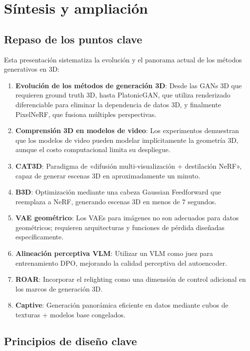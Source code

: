 \section{Síntesis y ampliación}

\subsection{Repaso de los puntos clave}

Esta presentación sistematiza la evolución y el panorama actual de los métodos generativos en 3D:

\begin{enumerate}
    \item \textbf{Evolución de los métodos de generación 3D}: Desde las GANs 3D que requieren ground truth 3D, hasta PlatonicGAN, que utiliza renderizado diferenciable para eliminar la dependencia de datos 3D, y finalmente PixelNeRF, que fusiona múltiples perspectivas.
    \item \textbf{Comprensión 3D en modelos de video}: Los experimentos demuestran que los modelos de video pueden modelar implícitamente la geometría 3D, aunque el costo computacional limita su despliegue.
    \item \textbf{CAT3D}: Paradigma de «difusión multi-visualización + destilación NeRF», capaz de generar escenas 3D en aproximadamente un minuto.
    \item \textbf{B3D}: Optimización mediante una cabeza Gaussian Feedforward que reemplaza a NeRF, generando escenas 3D en menos de 7 segundos.
    \item \textbf{VAE geométrico}: Los VAEs para imágenes no son adecuados para datos geométricos; requieren arquitecturas y funciones de pérdida diseñadas específicamente.
    \item \textbf{Alineación perceptiva VLM}: Utilizar un VLM como juez para entrenamiento DPO, mejorando la calidad perceptiva del autoencoder.
    \item \textbf{ROAR}: Incorporar el relighting como una dimensión de control adicional en los marcos de generación 3D.
    \item \textbf{Captive}: Generación panorámica eficiente en datos mediante cubos de texturas + modelos base congelados.
\end{enumerate}

\subsection{Principios de diseño clave}

